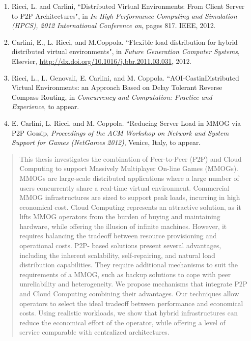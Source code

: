 \documentclass[final,10pt,a5paper]{phdimt}
\theoremstyle{definition}
\begin{document}
{\begin{enumerate}
\item Ricci, L. and Carlini, ``Distributed Virtual Environments: From Client Server to P2P Architectures", in \emph{In High Performance Computing and Simulation (HPCS), 2012 International Conference on}, pages 817. IEEE, 2012.

\item Carlini, E., L. Ricci, and M.Coppola. ``Flexible load distribution for hybrid distributed virtual environments", in \emph{Future Generation Computer Systems}, Elsevier, \url{http://dx.doi.org/10.1016/j.bbr.2011.03.031}, 2012.

\item Ricci, L., L. Genovali, E. Carlini, and M. Coppola. ``AOI-CastinDistributed Virtual Environments: an Approach Based on Delay Tolerant Reverse Compass Routing, in \emph{Concurrency and Computation: Practice and Experience}, to appear.


\item E. Carlini, L. Ricci, and M. Coppola. ``Reducing Server Load in MMOG via P2P Gossip, \emph{Proceedings of the ACM Workshop on Network and System Support for Games (NetGames 2012)}, Venice, Italy, to appear.


\end{enumerate}
}
%
\clearpage{}
\clearpage{}

\begin{abstract} 


This thesis investigates the combination of Peer-to-Peer (P2P) and Cloud Computing to support Massively Multiplayer On-line Games (MMOGs). MMOGs are large-scale distributed applications where a large number of users concurrently share a real-time virtual environment. Commercial MMOG infrastructures are sized to support peak loads, incurring in high economical cost. Cloud Computing represents an attractive solution, as it lifts MMOG operators from the burden of buying and maintaining hardware, while offering the illusion of infinite machines. However, it requires balancing the tradeoff between resource provisioning and operational costs. P2P- based solutions present several advantages, including the inherent scalability, self-repairing, and natural load distribution capabilities. They require additional mechanisms to suit the requirements of a MMOG, such as backup solutions to cope with peer unreliability and heterogeneity. We propose mechanisms that integrate P2P and Cloud Computing combining their advantages. Our techniques allow operators to select the ideal tradeoff between performance and economical costs. Using realistic workloads, we show that hybrid infrastructures can reduce the economical effort of the operator, while offering a level of service comparable with centralized architectures.

\end{abstract}
\clearpage{}
\end{document}

